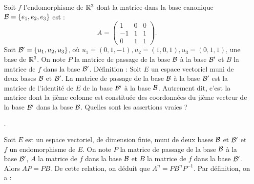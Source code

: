 \begin{question}
Soit $f$ l'endomorphisme de $\mathbb{R}^3$ dont la matrice dans la base canonique ${\cal B}=\{e_1,e_2,e_3\}$ est : 
$$A=\left(\begin{array}{rcc}1&0&0\\ -1&1&1\\ 
0&1&1 \end{array}\right).$$
Soit ${\cal B}' = \{u_1, u_2,  u_3\}$, où  $u_1=(0,1,-1), u_2=(1,0,1), u_3=(0,1,1)$, une base de  $\mathbb{R}^3$. On note $P$ la matrice de passage de la base ${\cal B}$ à la base ${\cal B}'$ et $B$ la matrice de $f$ dans la base ${\cal B}'$.
\vskip0mm
Définition : Soit $E$ un espace vectoriel muni de deux bases ${\cal {B}}$ et ${\cal {B}}'$. La matrice de passage de la base ${\cal {B}}$ à la base  ${\cal {B}}'$ est la matrice de l'identité de $E$ de la base ${\cal {B}}'$ à la base  ${\cal {B}}$. Autrement dit, c'est la matrice dont la jième colonne est constituée des coordonnées du jième vecteur de la base ${\cal {B}'}$ dans la base  ${\cal {B}}$.
\vskip0mm
Quelles sont les assertions vraies ?
\begin{answers}  
.
\end{answers}
\begin{explanations}Soit $E$ est un espace vectoriel, de dimension finie, muni de deux bases ${\cal B}$ et ${\cal B}'$ et $f$ un endomorphisme de $E$. On note $P$ la matrice de passage de la base ${\cal B}$ à la base ${\cal B}'$, $A$ la matrice de $f$ dans la base ${\cal B}$ et $B$ la matrice de $f$ dans la base ${\cal B}'$. Alors $AP=PB$. De cette relation, on déduit que $A^n=PB^nP^{-1}$. Par définition, on a :

\end{explanations}
\end{question}
